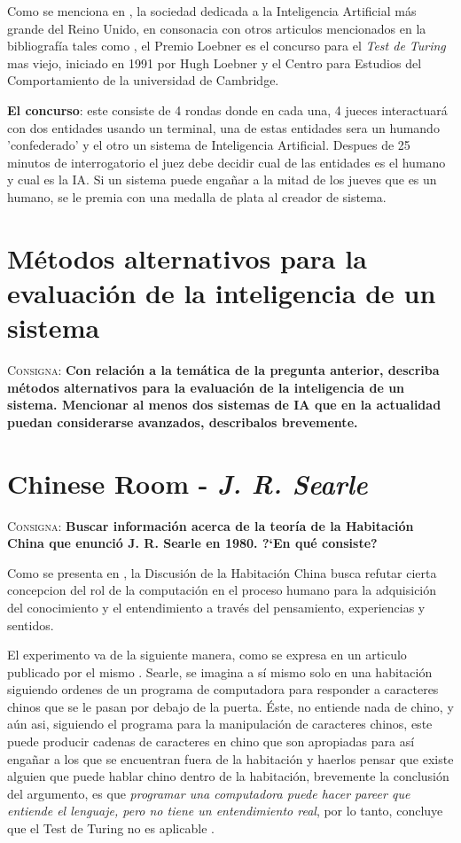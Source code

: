 \documentclass{article}
\begin{document}
Como se menciona en \cite{loebner1}, la sociedad dedicada a la Inteligencia Artificial m\'as grande del Reino Unido, en consonacia con otros articulos mencionados en la bibliograf\'ia tales como \cite{loebner2} \cite{loebner3}, el Premio Loebner es el concurso para el \textit{Test de Turing} mas viejo, iniciado en 1991 por Hugh Loebner y el Centro para Estudios del Comportamiento de la universidad de Cambridge.

\textbf{El concurso}: este consiste de 4 rondas donde en cada una, 4 jueces interactuar\'a con dos entidades usando un terminal, una de estas entidades sera un humando 'confederado' y el otro un sistema de Inteligencia Artificial. Despues de 25 minutos de interrogatorio el juez debe decidir cual de las entidades es el humano y cual es la IA. Si un sistema puede enga\~nar a la mitad de los jueves que es un humano, se le premia con una medalla de plata al creador de sistema.


\section{M\'etodos alternativos para la evaluaci\'on de la inteligencia de un sistema}
\textsc{Consigna}: \textbf{Con relaci\'on a la tem\'atica de la pregunta anterior, describa m\'etodos alternativos para la evaluaci\'on de la inteligencia de un sistema. Mencionar al menos dos sistemas de IA que en la actualidad puedan considerarse avanzados, describalos brevemente.}

\section{Chinese Room - \textit{J. R. Searle}}
\textsc{Consigna}: \textbf{Buscar informaci\'on acerca de la teor\'ia de la Habitaci\'on China que enunci\'o J. R. Searle en 1980. ?`En qu\'e consiste?}


Como se presenta en \cite{searle2009}, la Discusi\'on de la Habitación China busca refutar cierta concepcion del rol de la computaci\'on en el proceso humano para la adquisici\'on del conocimiento y el entendimiento a trav\'es del pensamiento, experiencias y sentidos.

El experimento va de la siguiente manera, como se expresa en un articulo publicado por el mismo \cite{searle1980}. Searle, se imagina a s\'i mismo solo en una habitaci\'on siguiendo ordenes de un programa de computadora para responder a caracteres chinos que se le pasan por debajo de la puerta. \'Este, no entiende nada de chino, y a\'un asi, siguiendo el programa para la manipulaci\'on de caracteres chinos, este puede producir cadenas de caracteres en chino que son apropiadas para as\'i enga\~nar a los que se encuentran fuera de la habitaci\'on y haerlos pensar que existe alguien que puede hablar chino dentro de la habitaci\'on, brevemente la conclusi\'on del argumento, es que \textit{programar una computadora puede hacer pareer que entiende el lenguaje, pero no tiene un entendimiento real}, por lo tanto, concluye que el Test de Turing no es aplicable \cite{cole2014}.
\end{document}
